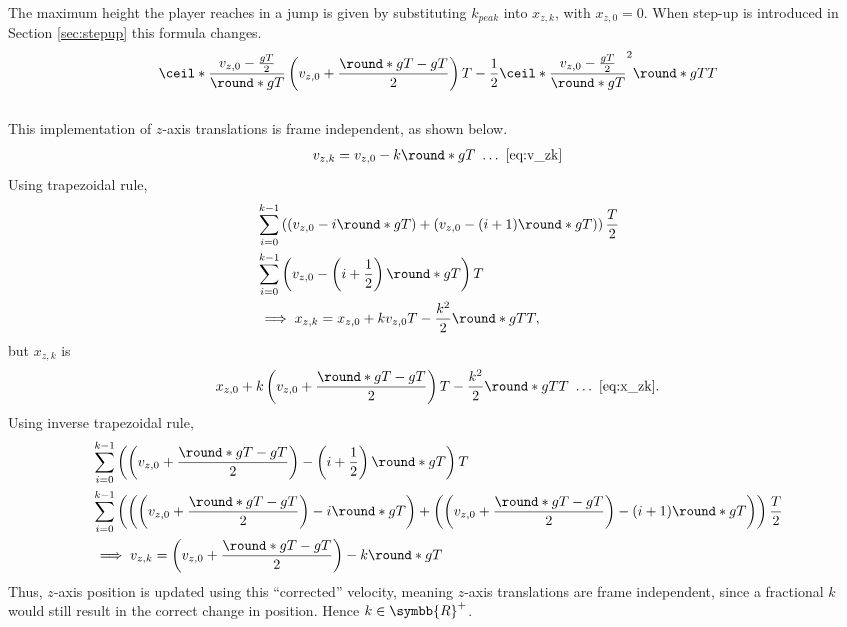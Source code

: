The maximum height the player reaches in a jump is given by substituting $k_{peak}$ into $x_{z,k}$, with $x_{z,0} = 0$.
When step-up is introduced in Section \ref{sec:stepup} this formula changes.
\begin{align}
\label{eq:max_jump_height}
\ceil*{\frac{v_{z,0} - \frac{gT}{2}}{\round*{gT}}}\left(v_{z,0} + \frac{\round*{gT} - gT}{2} \right) T - \frac{1}{2}\ceil*{\frac{v_{z,0} - \frac{gT}{2}}{\round*{gT}}}^2 \round*{gT} T
\end{align}
\\
This implementation of $z$-axis translations is frame independent, as shown below.
\begin{align*}
v_{z,k} = v_{z,0} - k\round*{gT}\ \ldots\ \eqref{eq:v_zk}
\end{align*}
Using trapezoidal rule,
\begin{align*}
&\sum_{i=0}^{k-1} \left(\left(v_{z,0} - i\round*{gT} \right) + \left(v_{z,0} - (i + 1) \round*{gT} \right)\right) \frac{T}{2}\\
&\sum_{i=0}^{k-1} \left(v_{z,0} - \left(i + \frac{1}{2} \right) \round*{gT} \right) T\\
&\implies x_{z,k} = x_{z,0} + k v_{z,0} T - \frac{k^2}{2}\round*{gT} T,
\end{align*}
but $x_{z,k}$ is
\begin{align*}
x_{z,0} + k\left(v_{z,0} + \frac{\round*{gT} - gT}{2} \right) T - \frac{k^2}{2}\round*{gT} T\ \ldots\ \eqref{eq:x_zk}.
\end{align*}
Using inverse trapezoidal rule,
\begin{align}
\nonumber
&\sum_{i=0}^{k-1} \left(\left(v_{z,0} + \frac{\round*{gT} - gT}{2} \right) - \left(i + \frac{1}{2} \right) \round*{gT} \right) T\\\nonumber
&\sum_{i=0}^{k-1} \left(\left(\left(v_{z,0} + \frac{\round*{gT} - gT}{2} \right) - i\round*{gT} \right) + \left(\left(v_{z,0} + \frac{\round*{gT} - gT}{2} \right) - (i + 1)\round*{gT} \right) \right) \frac{T}{2}\\
\label{eq:corrected_v_zk}
&\implies v_{z,k} = \left(v_{z,0} + \frac{\round*{gT} - gT}{2} \right) - k\round*{gT}
\end{align}
Thus, $z$-axis position is updated using this ``corrected'' velocity, meaning $z$-axis translations are frame independent, since a fractional $k$ would still result in the correct change in position. Hence $k \in \symbb{R}^+$.\\

